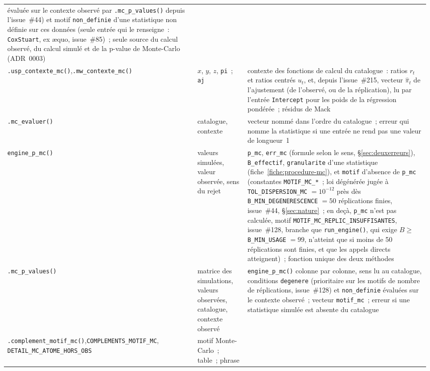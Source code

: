 \documentclass[a4paper,11pt]{article}
\newcommand{\code}[1]{\texttt{\small #1}}
\begin{document}
{\begin{longtable}{@{}p{4.6cm}p{4.0cm}p{6.2cm}@{}}
évaluée sur le contexte observé par \code{.mc\_p\_values()} depuis l'issue~\#44) et motif
\code{non\_definie} d'une statistique non définie sur ces données (seule entrée qui le renseigne~:
\code{CoxStuart}, ex \ae quo, issue~\#85)~; seule source du calcul observé, du calcul simulé et
de la p-value de Monte-Carlo (ADR~0003) \\
\code{.usp\_contexte\_mc()},\newline \code{.mw\_contexte\_mc()} & $x$, $y$, $z$, \code{pi}~; \code{aj} &
contexte des fonctions de calcul du catalogue~: ratios $r_t$ et ratios centrés $u_t$, et, depuis
l'issue~\#215, vecteur $\hat\pi_t$ de l'ajustement (de l'observé, ou de la réplication), lu par
l'entrée \code{Intercept} pour les poids de la régression pondérée~;
résidus de Mack \\
\code{.mc\_evaluer()} & catalogue, contexte & vecteur nommé dans l'ordre du catalogue~; erreur
qui nomme la statistique si une entrée ne rend pas une valeur de longueur~1 \\
\code{engine\_p\_mc()} & valeurs simulées, valeur observée, sens du rejet & \code{p\_mc},
\code{err\_mc} (formule selon le sens, §\ref{sec:deuxerreurs}), \code{B\_effectif},
\code{granularite} d'une statistique (fiche~\ref{fiche:procedure-mc}), et \code{motif}
d'absence de \code{p\_mc} (constantes \code{MOTIF\_MC\_*}~; loi dégénérée jugée à
\code{TOL\_DISPERSION\_MC} $= 10^{-12}$ près dès \code{B\_MIN\_DEGENERESCENCE} $= 50$
réplications finies, issue~\#44, §\ref{sec:nature}~; en deçà, \code{p\_mc} n'est pas calculée,
motif \code{MOTIF\_MC\_REPLIC\_INSUFFISANTES}, issue~\#128, branche que \code{run\_engine()},
qui exige $B \ge$ \code{B\_MIN\_USAGE} $= 99$, n'atteint que si moins de 50 réplications sont
finies, et que les appels directs atteignent)~; fonction unique des deux méthodes \\
\code{.mc\_p\_values()} & matrice des simulations, valeurs observées, catalogue, contexte
observé & \code{engine\_p\_mc()} colonne par colonne, sens lu au catalogue, conditions
\code{degenere} (prioritaire sur les motifs de nombre de réplications, issue~\#128) et
\code{non\_definie} évaluées sur le contexte observé~; vecteur
\code{motif\_mc}~; erreur si une statistique simulée est absente du catalogue \\
\code{.complement\_motif\_mc()},\newline \code{COMPLEMENTS\_}\newline\code{MOTIF\_MC},\newline
\code{DETAIL\_MC\_ATOME\_}\newline\code{HORS\_OBS} & motif Monte-Carlo~; table~; phrase &

\end{longtable}}
\end{document}
